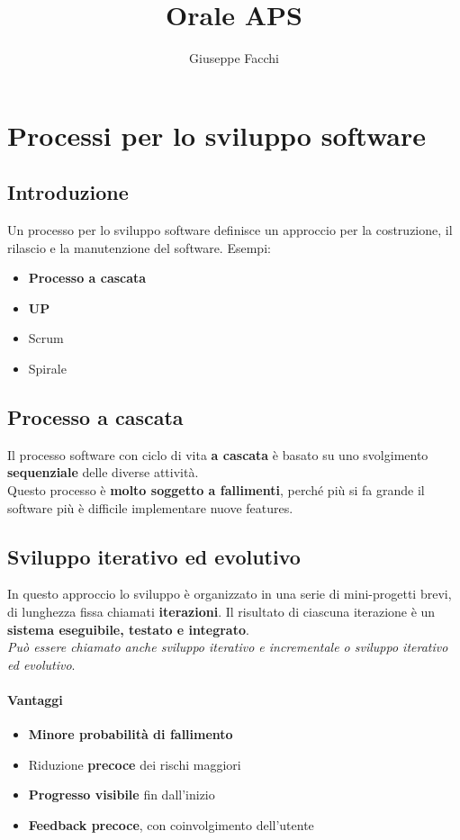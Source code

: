 \documentclass[12pt]{article}
\title{Orale APS}
\author{Giuseppe Facchi}
\begin{document}
\maketitle
\tableofcontents

\newpage

\section{Processi per lo sviluppo software}
\subsection{Introduzione}
Un processo per lo sviluppo software definisce un approccio per la costruzione, il rilascio e la manutenzione del software. Esempi:
\begin{itemize}
    \item \textbf{Processo a cascata}
    \item \textbf{UP}
    \item Scrum
    \item Spirale
\end{itemize}
\subsection{Processo a cascata}
Il processo software con ciclo di vita \textbf{a cascata} è basato su uno svolgimento \textbf{sequenziale} delle diverse attività.\\
Questo processo è \textbf{molto soggetto a fallimenti}, perché più si fa grande il software più è difficile implementare nuove features.

\subsection{Sviluppo iterativo ed evolutivo}
In questo approccio lo sviluppo è organizzato in una serie di mini-progetti brevi, di lunghezza fissa chiamati \textbf{iterazioni}. Il risultato di ciascuna iterazione è un \textbf{sistema eseguibile, testato e integrato}.\\
\textit{Può essere chiamato anche sviluppo iterativo e incrementale o sviluppo iterativo ed evolutivo}.
\paragraph{Vantaggi}
\begin{itemize}
    \item \textbf{Minore probabilità di fallimento}
    \item Riduzione \textbf{precoce} dei rischi maggiori
    \item \textbf{Progresso visibile} fin dall'inizio
    \item \textbf{Feedback precoce}, con coinvolgimento dell'utente
\end{itemize}
\end{document}

